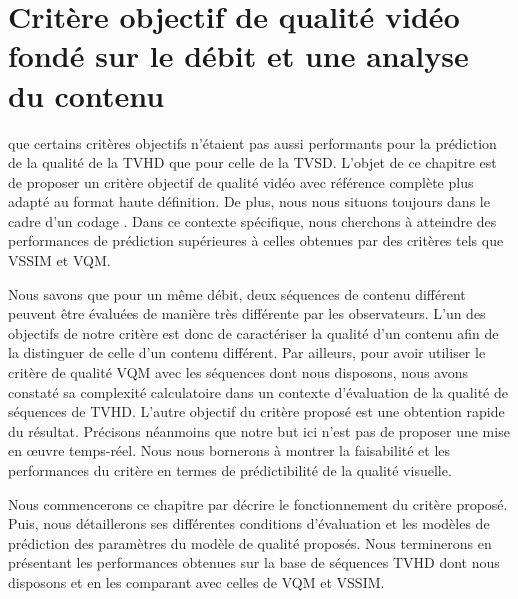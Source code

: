 
\newcommand\offset{\mathit{decalage}}
\newcommand\slope{\mathit{pente}}

\chapter[Critère objectif de qualité vidéo fondé sur le débit et une analyse du contenu]{Critère objectif de qualité vidéo \\fondé sur le débit et une analyse du contenu} \label{chap:MQV1}
 que certains critères objectifs n'étaient pas aussi performants pour la prédiction de la qualité de la TVHD que pour celle de la TVSD. L'objet de ce chapitre est de proposer un critère objectif de qualité vidéo avec référence complète plus adapté au format haute définition. De plus, nous nous situons toujours dans le cadre d'un codage \avc. Dans ce contexte spécifique, nous cherchons à atteindre des performances de prédiction supérieures à celles obtenues par des critères tels que VSSIM et VQM.

Nous savons que pour un même débit, deux séquences de contenu différent peuvent être évaluées de manière très différente par les observateurs. L'un des objectifs de notre critère est donc de caractériser la qualité d'un contenu afin de la distinguer de celle d'un contenu différent. Par ailleurs, pour avoir utiliser le critère de qualité VQM avec les séquences dont nous disposons, nous avons constaté sa complexité calculatoire dans un contexte d'évaluation de la qualité de séquences de TVHD. L'autre objectif du critère proposé est une obtention rapide du résultat. Précisons néanmoins que notre but ici n'est pas de proposer une mise en \oe uvre temps-réel. Nous nous bornerons à montrer la faisabilité et les performances du critère en termes de prédictibilité de la qualité visuelle.

Nous commencerons ce chapitre par décrire le fonctionnement du critère proposé. Puis, nous détaillerons ses différentes conditions d'évaluation et les modèles de prédiction des paramètres du modèle de qualité proposés. Nous terminerons en présentant les performances obtenues sur la base de séquences TVHD dont nous disposons et en les comparant avec celles de VQM et VSSIM.


